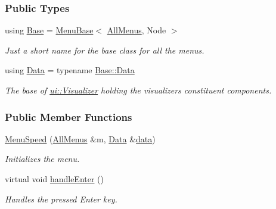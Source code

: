 \subsubsection*{Public Types}
\begin{DoxyCompactItemize}
\item 
using \hyperlink{structslb_1_1core_1_1ui_1_1MenuSpeed_ae987e48b635324369e990cd00939a360}{Base} = \hyperlink{structslb_1_1core_1_1ui_1_1MenuBase}{Menu\+Base}$<$ \hyperlink{structslb_1_1core_1_1ui_1_1AllMenus}{All\+Menus}, Node $>$\hypertarget{structslb_1_1core_1_1ui_1_1MenuSpeed_ae987e48b635324369e990cd00939a360}{}\label{structslb_1_1core_1_1ui_1_1MenuSpeed_ae987e48b635324369e990cd00939a360}

\begin{DoxyCompactList}\small\item\em Just a short name for the base class for all the menus. \end{DoxyCompactList}\item 
using \hyperlink{structslb_1_1core_1_1ui_1_1MenuSpeed_af6e63fa87c332af573c88fae9cd16e40}{Data} = typename \hyperlink{structslb_1_1core_1_1ui_1_1MenuBase_a1803444111552d2e5b87671292dd74cb}{Base\+::\+Data}\hypertarget{structslb_1_1core_1_1ui_1_1MenuSpeed_af6e63fa87c332af573c88fae9cd16e40}{}\label{structslb_1_1core_1_1ui_1_1MenuSpeed_af6e63fa87c332af573c88fae9cd16e40}

\begin{DoxyCompactList}\small\item\em The base of \hyperlink{structslb_1_1core_1_1ui_1_1Visualizer}{ui\+::\+Visualizer} holding the visualizer\textquotesingle{}s constituent components. \end{DoxyCompactList}\end{DoxyCompactItemize}
\subsubsection*{Public Member Functions}
\begin{DoxyCompactItemize}
\item 
\hyperlink{structslb_1_1core_1_1ui_1_1MenuSpeed_a99b8cfe5cd9b9c772fc0dd211bb10f8d}{Menu\+Speed} (\hyperlink{structslb_1_1core_1_1ui_1_1AllMenus}{All\+Menus} \&m, \hyperlink{structslb_1_1core_1_1ui_1_1MenuBase_a1803444111552d2e5b87671292dd74cb}{Data} \&\hyperlink{structslb_1_1core_1_1ui_1_1MenuBase_a475d9457affb2b4fc96737e269d6911f}{data})
\begin{DoxyCompactList}\small\item\em Initializes the menu. \end{DoxyCompactList}\item 
virtual void \hyperlink{structslb_1_1core_1_1ui_1_1MenuSpeed_a46ad50056f2907577f79b13bc22ade84}{handle\+Enter} ()\hypertarget{structslb_1_1core_1_1ui_1_1MenuSpeed_a46ad50056f2907577f79b13bc22ade84}{}\label{structslb_1_1core_1_1ui_1_1MenuSpeed_a46ad50056f2907577f79b13bc22ade84}

\begin{DoxyCompactList}\small\item\em Handles the pressed Enter key. \end{DoxyCompactList}\end{DoxyCompactItemize}
